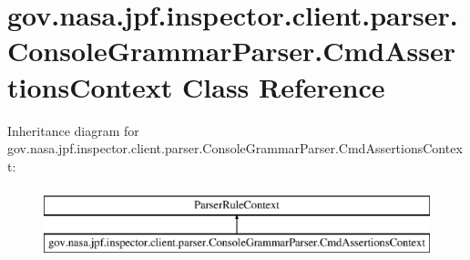\hypertarget{classgov_1_1nasa_1_1jpf_1_1inspector_1_1client_1_1parser_1_1_console_grammar_parser_1_1_cmd_assertions_context}{}\section{gov.\+nasa.\+jpf.\+inspector.\+client.\+parser.\+Console\+Grammar\+Parser.\+Cmd\+Assertions\+Context Class Reference}
\label{classgov_1_1nasa_1_1jpf_1_1inspector_1_1client_1_1parser_1_1_console_grammar_parser_1_1_cmd_assertions_context}
Inheritance diagram for gov.\+nasa.\+jpf.\+inspector.\+client.\+parser.\+Console\+Grammar\+Parser.\+Cmd\+Assertions\+Context\+:\begin{figure}[H]
\begin{center}
\leavevmode
\includegraphics[height=2.000000cm]{classgov_1_1nasa_1_1jpf_1_1inspector_1_1client_1_1parser_1_1_console_grammar_parser_1_1_cmd_assertions_context}
\end{center}
\end{figure}
